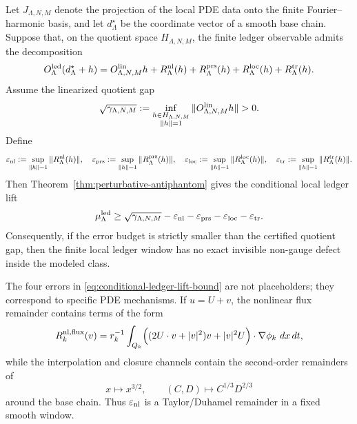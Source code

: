 \documentclass[11pt]{article}
\numberwithin{equation}{section}
\newcommand{\eps}{\varepsilon}
\newcommand{\dd}{\,d}
\begin{document}
Let $J_{\Lambda,N,M}$ denote the projection of the local PDE data onto the finite Fourier--harmonic basis, and let $d_\Lambda^\star$ be the coordinate vector of a smooth base chain.  Suppose that, on the quotient space $H_{\Lambda,N,M}$, the finite ledger observable admits the decomposition
\begin{equation}\label{eq:local-ledger-linear-plus-errors}
    O_\Lambda^{\rm led}(d_\Lambda^\star+h)
    =
    O_{\Lambda,N,M}^{\rm lin}h
    +R_\Lambda^{\rm nl}(h)
    +R_\Lambda^{\rm prs}(h)
    +R_\Lambda^{\rm loc}(h)
    +R_\Lambda^{\rm tr}(h).
\end{equation}
Assume the linearized quotient gap
\begin{equation}\label{eq:local-ledger-linear-gap}
    \sqrt{\gamma_{\Lambda,N,M}}
    :=
    \inf_{\substack{h\in H_{\Lambda,N,M}\\ \|h\|=1}}
    \|O_{\Lambda,N,M}^{\rm lin}h\|>0.
\end{equation}
Define
\[
    \eps_{\rm nl}:=\sup_{\|h\|=1}\|R_\Lambda^{\rm nl}(h)\|,
    \quad
    \eps_{\rm prs}:=\sup_{\|h\|=1}\|R_\Lambda^{\rm prs}(h)\|,
    \quad
    \eps_{\rm loc}:=\sup_{\|h\|=1}\|R_\Lambda^{\rm loc}(h)\|,
    \quad
    \eps_{\rm tr}:=\sup_{\|h\|=1}\|R_\Lambda^{\rm tr}(h)\|.
\]
Then Theorem~\ref{thm:perturbative-antiphantom} gives the conditional local ledger lift
\begin{equation}\label{eq:conditional-ledger-lift-bound}
    \mu_\Lambda^{\rm led}
    \ge
    \sqrt{\gamma_{\Lambda,N,M}}
    -\eps_{\rm nl}-\eps_{\rm prs}-\eps_{\rm loc}-\eps_{\rm tr}.
\end{equation}
Consequently, if the error budget is strictly smaller than the certified quotient gap, then the finite local ledger window has no exact invisible non-gauge defect inside the modeled class.

The four errors in \eqref{eq:conditional-ledger-lift-bound} are not placeholders; they correspond to specific PDE mechanisms.  If $u=U+v$, the nonlinear flux remainder contains terms of the form
\begin{equation}\label{eq:nonlinear-flux-remainder}
    R_k^{\rm nl,flux}(v)
    =
    r_k^{-1}\int_{Q_k}
    \Bigl(
      (2U\cdot v+|v|^2)v+|v|^2U
    \Bigr)\cdot\nabla\phi_k\,\dd x\dd t,
\end{equation}
while the interpolation and closure channels contain the second-order remainders of
\[
    x\mapsto x^{3/2},
    \qquad
    (C,D)\mapsto C^{1/3}D^{2/3}
\]
around the base chain.  Thus $\eps_{\rm nl}$ is a Taylor/Duhamel remainder in a fixed smooth window.
\end{document}
